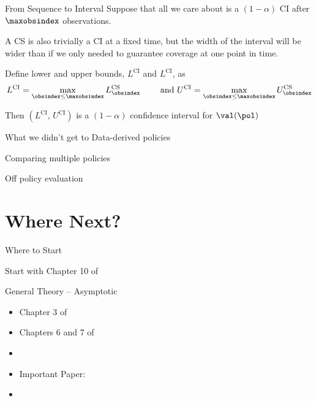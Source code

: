 \documentclass[aspectratio=169, professionalfonts]{beamer}
\begin{document}
\begin{frame}{From Sequence to Interval}
	Suppose that all we care about is a $(1 - \alpha)$ CI after $\maxobsindex$
	observations.

	\vfill
	A CS is also trivially a CI at a fixed time, but the width of the interval
	will be wider than if we only needed to guarantee coverage at one point in
	time.

	\vfill \pause

	\begin{lemma} Define lower and upper bounds, $L^{\text{CI}}$ and
		$L^{\text{CI}}$, as
		$$L^{\text{CI}} = \max_{\obsindex \leq \maxobsindex}
			L_{\obsindex}^{\text{CS}} \qquad \text{ and } U^{\text{CI}} = \max_{\obsindex \leq
				\maxobsindex} U_{\obsindex}^{\text{CS}}$$

		Then $(L^{\text{CI}},\, U^{\text{CI}})$ is a $(1 - \alpha)$ confidence
		interval for $\val(\pol)$
	\end{lemma}
\end{frame}

\begin{frame}{What we didn't get to}
	Data-derived policies

	Comparing multiple policies

	Off policy evaluation
\end{frame}
\section{Where Next?}

\begin{frame}{Where to Start}
	\vfill

	Start with Chapter 10 of \cite{tsiatis2019Dynamic}
	\vfill

\end{frame}

\begin{frame}{General Theory -- Asymptotic}
	\vfill
	\begin{itemize}
		\item Chapter 3 of \cite{tsiatis2006Semiparametric}
		      \vfill
		\item Chapters 6 and 7 of \cite{vandervaart2000Asymptotic}
		      \vfill
		\item \cite{kosorok2008Introduction}
		      \vfill
		\item Important Paper: \cite{hirano2012Impossibility}
		      \vfill


		\item 	\cite{bibaut2021PostContextualBandit}
		      \vfill
	\end{itemize}
\end{frame}
\end{document}
